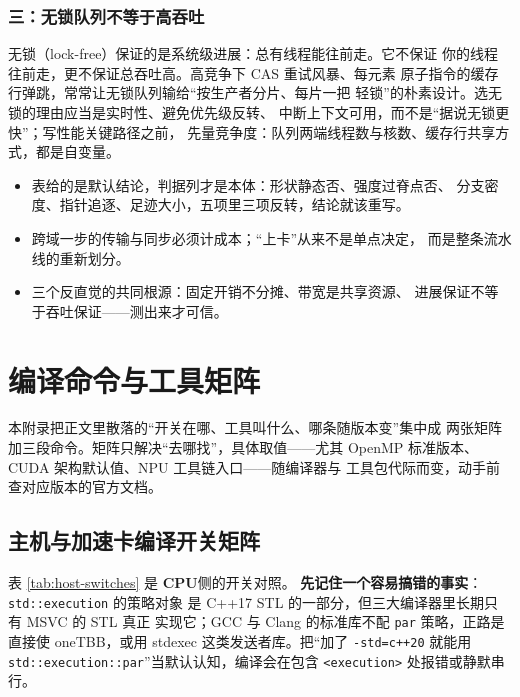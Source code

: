 \documentclass[12pt,a4paper,fontset=fandol]{ctexbook}
\newcommand{\cpp}[1]{C++#1}
\newcommand{\Tp}[1]{\texttt{#1}}
\newcommand{\Dom}[1]{\textsf{\bfseries #1}}
\newcommand{\CPU}{\Dom{CPU}}
\begin{document}
\subsection{三：无锁队列不等于高吞吐}

无锁（lock-free）保证的是系统级进展：总有线程能往前走。它不保证
你的线程往前走，更不保证总吞吐高。高竞争下 CAS 重试风暴、每元素
原子指令的缓存行弹跳，常常让无锁队列输给``按生产者分片、每片一把
轻锁''的朴素设计。选无锁的理由应当是实时性、避免优先级反转、
中断上下文可用，而不是``据说无锁更快''；写性能关键路径之前，
先量竞争度：队列两端线程数与核数、缓存行共享方式，都是自变量。

\begin{guideline}[title={速查表的正确用法}]
\begin{itemize}
\item 表给的是默认结论，判据列才是本体：形状静态否、强度过脊点否、
分支密度、指针追逐、足迹大小，五项里三项反转，结论就该重写。
\item 跨域一步的传输与同步必须计成本；``上卡''从来不是单点决定，
而是整条流水线的重新划分。
\item 三个反直觉的共同根源：固定开销不分摊、带宽是共享资源、
进展保证不等于吞吐保证——测出来才可信。
\end{itemize}
\end{guideline}
\chapter{编译命令与工具矩阵}

本附录把正文里散落的``开关在哪、工具叫什么、哪条随版本变''集中成
两张矩阵加三段命令。矩阵只解决``去哪找''，具体取值——尤其
OpenMP 标准版本、CUDA 架构默认值、NPU 工具链入口——随编译器与
工具包代际而变，动手前查对应版本的官方文档。

\section{主机与加速卡编译开关矩阵}

表 \ref{tab:host-switches} 是 \CPU{}侧的开关对照。
\textbf{先记住一个容易搞错的事实}：\Tp{std::execution} 的策略对象
是 \cpp{17} STL 的一部分，但三大编译器里长期只有 MSVC 的 STL 真正
实现它；GCC 与 Clang 的标准库不配 \Tp{par} 策略，正路是直接使
oneTBB，或用 stdexec 这类发送者库。把``加了 \Tp{-std=c++20}
就能用 \Tp{std::execution::par}''当默认认知，编译会在包含
\Tp{<execution>} 处报错或静默串行。
\end{document}
